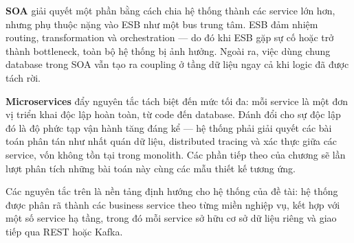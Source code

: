 \documentclass[../DoAn.tex]{subfiles}
\begin{document}
\textbf{SOA} giải quyết một phần bằng cách chia hệ thống thành các service lớn hơn, nhưng
phụ thuộc nặng vào ESB như một bus trung tâm. ESB đảm nhiệm routing, transformation và
orchestration --- do đó khi ESB gặp sự cố hoặc trở thành bottleneck, toàn bộ hệ thống bị
ảnh hưởng. Ngoài ra, việc dùng chung database trong SOA vẫn tạo ra coupling ở tầng dữ liệu
ngay cả khi logic đã được tách rời.

\textbf{Microservices} đẩy nguyên tắc tách biệt đến mức tối đa: mỗi service là một đơn vị
triển khai độc lập hoàn toàn, từ code đến database. Đánh đổi cho sự độc lập đó là độ phức
tạp vận hành tăng đáng kể --- hệ thống phải giải quyết các bài toán phân tán như nhất quán
dữ liệu, distributed tracing và xác thực giữa các service, vốn không tồn tại trong monolith.
Các phần tiếp theo của chương sẽ lần lượt phân tích những bài toán này cùng các mẫu thiết
kế tương ứng.

Các nguyên tắc trên là nền tảng định hướng cho hệ thống của đề tài: hệ thống được phân rã thành các business service theo từng miền nghiệp vụ, kết hợp với một số service hạ tầng, trong đó mỗi service sở hữu cơ sở dữ liệu riêng và giao tiếp qua REST hoặc Kafka.


\end{document}

